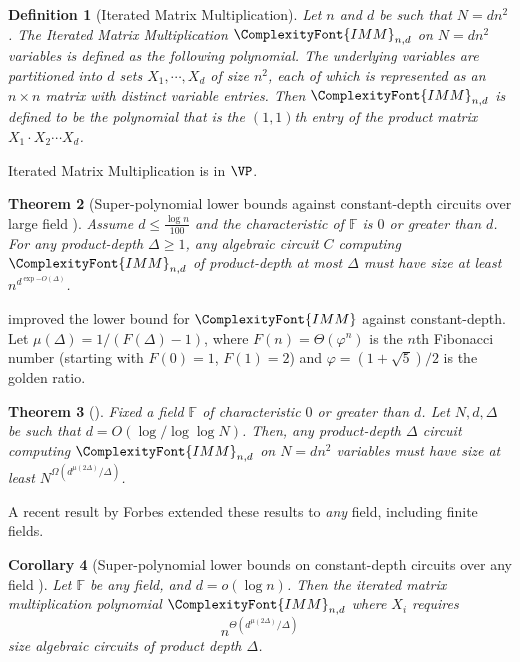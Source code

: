 \documentclass[11pt,letter]{article}
\newtheorem{theorem}{Theorem}[section]
\newtheorem{definition}[theorem]{Definition}
\newtheorem{corollary}[theorem]{Corollary}
\theoremstyle{remark} %
\newcommand{\IMM}{\ComplexityFont{IMM}}
\newcommand{\F}{\mathbb{F}}
\begin{document}
{    
    \begin{definition}[Iterated Matrix Multiplication]
        Let $n$ and $d$ be such that $N=dn^2$. The \emph{Iterated Matrix Multiplication} $\IMM_{n,d}$ on $N=dn^2$ variables is defined as the following polynomial. The underlying variables are partitioned into $d$ sets $X_1,\cdots,X_d$ of size $n^2$, each of which is represented as an $n \times n$ matrix with distinct variable entries. Then $\IMM_{n,d}$ is defined to be the polynomial that is the $(1,1)$th entry of the product matrix $X_1\cdot X_2 \cdots X_d$.
    \end{definition}

    Iterated Matrix Multiplication is in $\VP$.

    \begin{theorem}[Super-polynomial lower bounds against constant-depth circuits over large field \cite{LST25}]\label{theorem: first-LST25}
        Assume $d \leq \frac{\log n}{100}$ and the characteristic of $\mathbb{F}$ is $0$ or greater than $d$. For any product-depth $\Delta \geq 1$, any algebraic circuit $C$ computing $\IMM_{n,d}$ of product-depth at most $\Delta$ must have size at least $n^{d^{\exp{-O(\Delta)}}}$. 
    \end{theorem}

    \cite{BDS24} improved the lower bound for $\IMM$ against constant-depth. Let $\mu(\Delta) = 1/ (F(\Delta)-1)$, where $F(n)= \Theta(\varphi^n)$ is the $n$th Fibonacci number (starting with $F(0) = 1$, $F(1) =2$) and $\varphi = (1 + \sqrt{5})/2$ is the golden ratio.
    \begin{theorem}[\cite{BDS24}]
        \label{theorem: BDS24}
        Fixed a field $\F$ of characteristic $0$ or greater than $d$. Let $N, d, \Delta$ be such that $d= O(\log / \log \log N)$. Then, any product-depth $\Delta$ circuit computing $\IMM_{n,d}$ on $N = dn^2$ variables must have size at least $N^{\Omega(d^{\mu(2\Delta)}/ \Delta)}$.
    \end{theorem}

    A recent result by Forbes \cite{forbes2024low} extended these results to \emph{any} field, including finite fields.
    
    \begin{corollary}[Super-polynomial lower bounds on constant-depth circuits over any field \cite{forbes2024low}]
        Let $\mathbb{F}$ be any field, and $d=o(\log n)$. Then the iterated matrix multiplication polynomial $\IMM_{n,d}$ where $X_i$ requires
         \[
             n^{\Theta(d^{\mu(2\Delta)}/ \Delta)}
         \]
         size algebraic circuits of product depth $\Delta$.
    \end{corollary}

}
\end{document}
